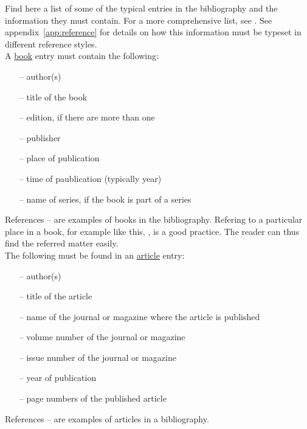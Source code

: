 \documentclass[english, 12pt, a4paper, biz, utf8, a-2b, online]{aaltothesis}
\begin{document}
Find here a list of some of the typical entries in the bibliography and the 
information they must contain. For a more comprehensive list, see 
\cite{aaltolib}. See appendix~\ref{app:reference} for details on how this 
information must be typeset in different reference styles.\\

\noindent
A \underline{book} entry must contain the following:
\begin{itemize}
\setlength{\itemsep}{-3pt}
\item[--]author(s) 
\item[--]title of the book
\item[--]edition, if there are more than one
\item[--]publisher
\item[--]place of publication
\item[--]time of paublication (typically year)
\item[--]name of series, if the book is part of a series
\end{itemize}
References \cite{Kauranen}--\cite{Koblitz} are examples of books in the 
bibliography. Refering to a particular place in a book, for example like this, 
\cite[s.\ 83--124]{Koblitz}, is a good practice. The reader can thus find the 
referred matter easily.\\

\noindent
The following must be found in an \underline{article} entry:
\begin{itemize}
	\setlength{\itemsep}{-3pt}
\item[--]author(s)
\item[--]title of the article
\item[--]name of the journal or magazine where the article is published
\item[--]volume number of the journal or magazine
\item[--]issue number of the journal or magazine
\item[--]year of publication
\item[--]page numbers of the published article
\end{itemize}
References \cite{bcs}--\cite{Deschamps} are examples of articles in a 
bibliography.\\
\end{document}
